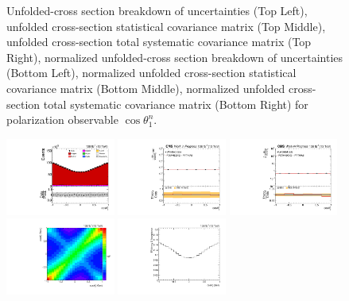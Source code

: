 \begin{figure}[htb]
\begin{center}
\caption{Unfolded-cross section breakdown of uncertainties (Top Left), unfolded cross-section statistical covariance matrix (Top Middle), unfolded cross-section total systematic covariance matrix (Top Right), normalized unfolded-cross section breakdown of uncertainties (Bottom Left), normalized unfolded cross-section statistical covariance matrix (Bottom Middle), normalized unfolded cross-section total systematic covariance matrix (Bottom Right) for polarization observable $\cos\theta_{1}^{n}$.}
\label{fig:b1n_uncertainties}
\end{center}
\end{figure}
\clearpage
\begin{figure}[htb]
\begin{center}
 \includegraphics[width=0.32\textwidth]{fig_fullRun2UL/controlplots/combined/Hyp_LeptonBn.pdf}
 \includegraphics[width=0.32\textwidth]{fig_fullRun2UL/unfolding/combined/UnfoldedResults_b2n.pdf}
 \includegraphics[width=0.32\textwidth]{fig_fullRun2UL/unfolding/combined/UnfoldedResultsNorm_b2n.pdf} \\
 \includegraphics[width=0.32\textwidth]{fig_fullRun2UL/unfolding/combined/ResponseMatrix_b2n.pdf}
 \includegraphics[width=0.32\textwidth]{fig_fullRun2UL/unfolding/combined/TotEff_b2n.pdf}

\end{center}
\end{figure}
